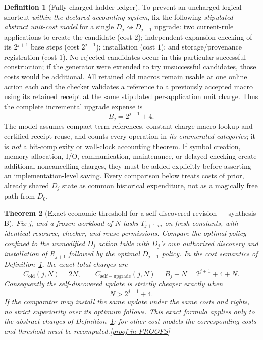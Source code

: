 \documentclass[11pt,letterpaper]{article}
\newtheorem{theorem}{Theorem}[section]
\theoremstyle{definition}
\newtheorem{definition}[theorem]{Definition}
\theoremstyle{remark}
\newcommand{\prooflink}[1]{\hfill\hyperlink{proof:#1}{\footnotesize[proof in PROOFS]}}
\begin{document}
\begin{definition}[Fully charged ladder ledger]\label{def:ledgercost}
To prevent an uncharged logical shortcut \emph{within the declared accounting system}, fix the following \emph{stipulated abstract unit-cost model} for a single $D_j\rightsquigarrow D_{j+1}$ upgrade: two current-rule applications to create the candidate (cost $2$); independent expansion checking of its $2^{j+1}$ base steps (cost $2^{j+1}$); installation (cost $1$); and storage/provenance registration (cost $1$). No rejected candidates occur in this particular successful construction; if the generator were extended to try unsuccessful candidates, those costs would be additional. All retained old macros remain usable at one online action each and the checker validates a reference to a previously accepted macro using its retained receipt at the same stipulated per-application unit charge. Thus the complete incremental upgrade expense is
\[
 B_j=2^{j+1}+4.
\]
The model assumes compact term references, constant-charge macro lookup and certified receipt reuse, and counts every operation in \emph{its enumerated categories}; it is \emph{not} a bit-complexity or wall-clock accounting theorem. If symbol creation, memory allocation, I/O, communication, maintenance, or delayed checking create additional noncancelling charges, they must be added explicitly before asserting an implementation-level saving. Every comparison below treats costs of prior, already shared $D_j$ state as common historical expenditure, not as a magically free path from $D_0$.
\end{definition}

\begin{theorem}[Exact economic threshold for a self-discovered revision --- synthesis B]\label{thm:laddercost}\hypertarget{claim:laddercost}{}
Fix $j$, and a frozen workload of $N$ tasks $T_{j+1,m}$ on fresh constants, with identical resource, checker, and reuse permissions. Compare the optimal policy confined to the \emph{unmodified} $D_j$ action table with $D_j$'s own authorized discovery and installation of $R_{j+1}$ followed by the optimal $D_{j+1}$ policy. In the cost semantics of Definition~\ref{def:ledgercost}, the exact total charges are
\[
 C_{\mathrm{old}}(j,N)=2N,\qquad C_{\mathrm{self-upgrade}}(j,N)=B_j+N=2^{j+1}+4+N.
\]
Consequently the self-discovered update is strictly cheaper exactly when
\[
 N>2^{j+1}+4.
\]
If the comparator may install the same update under the same costs and rights, no strict superiority over its optimum follows. This exact formula applies only to the abstract charges of Definition~\ref{def:ledgercost}; for other cost models the corresponding costs and threshold must be recomputed.\prooflink{laddercost}
\end{theorem}
\end{document}
